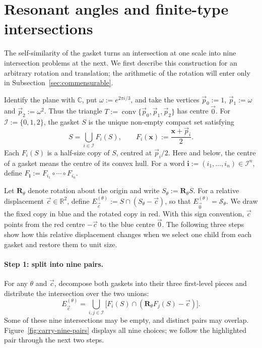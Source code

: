 \documentclass[scheme=plain]{ctexart}
\begin{document}
\section{Resonant angles and finite-type intersections}
\label{sec:carry-geometry}

The self-similarity of the gasket turns an intersection at one scale into nine
intersection problems at the next.  We first describe this construction for an
arbitrary rotation and translation; the arithmetic of the rotation will enter
only in Subsection~\ref{sec:commensurable}.

Identify the plane with $\mathbb C$, put $\omega:=e^{2\pi i/3}$, and take the
vertices $\vec p_0:=1$, $\vec p_1:=\omega$ and $\vec p_2:=\omega^2$.
Thus the triangle $T:=\operatorname{conv}\{\vec p_0,\vec p_1,\vec p_2\}$ has
centre $\vec{0}$.  For $\mathcal I:=\{0,1,2\}$, the gasket $S$ is the unique
non-empty compact set satisfying
\[
S=\bigcup_{i\in\mathcal I}F_i(S),
\qquad F_i(\mathbf x):=\frac{\mathbf x+\vec p_i}{2}.
\]
Each $F_i(S)$ is a half-size copy of $S$, centred at $\vec p_i/2$.
Here and below, the centre of a gasket means the centre of its convex hull.
For a word $\mathbf i:=(i_1,\ldots,i_n)\in\mathcal I^n$, define $F_{\mathbf i}:=F_{i_1}\circ\cdots\circ F_{i_n}$.

Let $\mathbf R_\theta$ denote rotation about the origin and write
$S_\theta:=\mathbf R_\theta S$.
For a relative displacement $\vec c\in\mathbb R^2$, define
$E_{\vec c}^{(\theta)}:=S\cap(S_\theta-\vec c)$, so that
$E_{\vec{0}}^{(\theta)}=\mathcal S_\theta$.
We draw the fixed copy in blue and the rotated copy in red.
With this sign convention, $\vec c$ points from the red centre $-\vec c$ to
the blue centre $\vec{0}$.
The following three steps show how this relative displacement changes when we select
one child from each gasket and restore them to unit size.




\paragraph{Step 1: split into nine pairs.}
For any $\theta$ and $\vec c$, decompose both gaskets into their three
first-level pieces and distribute the intersection over the two unions:
\[
E_{\vec c}^{(\theta)}
=\bigcup_{i,j\in\mathcal I}
\bigl[F_i(S)\cap(\mathbf R_\theta F_j(S)-\vec c)\bigr].
\]
Some of these nine intersections may be empty, and distinct pairs may overlap.
Figure~\ref{fig:carry-nine-pairs} displays all nine choices; we follow the
highlighted pair through the next two steps.
\end{document}
